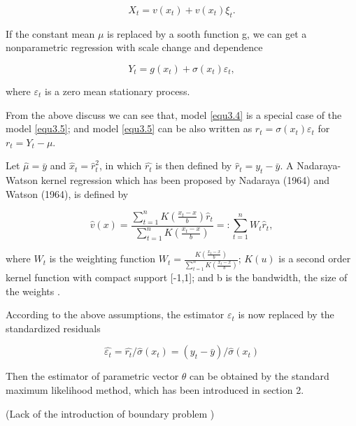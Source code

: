 \begin{equation}
\label{equ3.4}
 X_{t} = v(x_{t} )+ v(x_{t})\xi_{t}.
\end{equation}

If the constant mean $\mu$ is replaced by a sooth function g, we can get a nonparametric regression with scale change and dependence

\begin{equation}
\label{equ3.5}
Y_t= g(x_t)+\sigma(x_t)\varepsilon_t,
\end{equation}

where ${\varepsilon_t}$ is a zero mean stationary process.

From the above discuss we can see that, model \ref{equ3.4} is a special case of the model \ref{equ3.5}; and model \ref{equ3.5} can be also written as $r_t= \sigma(x_t)\varepsilon_t$ for  $ r_{t}=Y_{t}-\mu$.

Let $\hat{\mu }=\bar{y}$ and $\hat{x}_{t} = \hat{r}_{t}^{2}$, in which $\hat{r_{t}}$ is then defined by $\hat{r}_{t}=y_{t}-\bar{y}$. A Nadaraya-Watson kernel regression which has been proposed by Nadaraya (1964) and Watson (1964), is defined by

\begin{equation}
\hat{v}(x)=\frac{\sum_{t=1}^{n}K(\frac{x_t-x}{b})\hat{r}_t}{\sum_{t=1}^{n}K(\frac{x_t-x}{b})}=:\sum_{t=1}^nW_t\hat{r}_t,
\end{equation}

where $W_t$ is the weighting function  $W_t= \frac{K(\frac{x_t-x}{b})}{\sum_{t=1}^{n}K(\frac{x_t-x}{b})} $; $K(u)$ is a second order kernel function with compact support [-1,1]; and b is the bandwidth, the size of the weights \cite{Fan1993}. 

According to the above assumptions, the estimator $\varepsilon_{t}$  is now replaced by the standardized residuals

\begin{equation}
\hat{\varepsilon_t }=\hat{r_t}/\hat{\sigma }(x_t)=(y_t-\bar{y})/\hat{\sigma}(x_t) 
\end{equation}

Then the estimator of parametric vector $\theta$ can be obtained by the standard maximum likelihood method, which has been introduced in section 2.


(Lack of the introduction of boundary problem )


